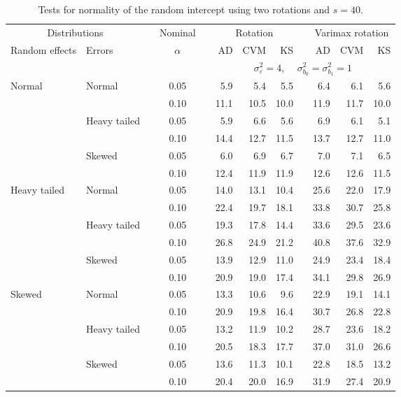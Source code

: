 \begin{table}[ht]
\caption{\label{tab:simb0s40-alt}Tests for normality of the random intercept using two rotations and $s = 40$.}
\begin{scriptsize}
\begin{center}
\begin{tabular}{ll p{.1cm} c p{.1cm} rrr p{.1cm} rrr}
  \hline
  \multicolumn{2}{c}{Distributions}& & Nominal & &  \multicolumn{3}{c}{Rotation} & & \multicolumn{3}{c}{Varimax rotation} \\ \cline{1-2} \cline{6-8} \cline{10-12}   
  Random effects & Errors & & $\alpha$ & & AD & CVM & KS & & AD & CVM & KS \\ 
   \hline
& && && \multicolumn{7}{c}{$\sigma_{\varepsilon}^2 = 4$, \ \ $\sigma_{b_0}^2 = \sigma_{b_1}^2 = 1$} \\ \cline{6-12}
Normal       & Normal       && 0.05 &&   5.9 & 5.4 & 5.5 &   & 6.4 & 6.1 & 5.6 \\ 
             &              && 0.10 &&   11.1 & 10.5 & 10.0 &   & 11.9 & 11.7 & 10.0 \\ 
             & Heavy tailed && 0.05 &&   5.9 & 6.6 & 5.6 &   & 6.9 & 6.1 & 5.1 \\ 
             &              && 0.10 &&   14.4 & 12.7 & 11.5 &   & 13.7 & 12.7 & 11.0 \\ 
             & Skewed       && 0.05 &&   6.0 & 6.9 & 6.7 &   & 7.0 & 7.1 & 6.5 \\ 
             &              && 0.10 &&   12.4 & 11.9 & 11.9 &   & 12.6 & 12.6 & 11.5 \\ 
Heavy tailed & Normal       && 0.05 &&   14.0 & 13.1 & 10.4 &   & 25.6 & 22.0 & 17.9 \\ 
             &              && 0.10 &&   22.4 & 19.7 & 18.1 &   & 33.8 & 30.7 & 25.8 \\ 
             & Heavy tailed && 0.05 &&   19.3 & 17.8 & 14.4 &   & 33.6 & 29.5 & 23.6 \\ 
             &              && 0.10 &&   26.8 & 24.9 & 21.2 &   & 40.8 & 37.6 & 32.9 \\ 
             & Skewed       && 0.05 &&   13.9 & 12.9 & 11.0 &   & 24.9 & 23.4 & 18.4 \\ 
             &              && 0.10 &&   20.9 & 19.0 & 17.4 &   & 34.1 & 29.8 & 26.9 \\ 
Skewed       & Normal       && 0.05 &&   13.3 & 10.6 & 9.6 &   & 22.9 & 19.1 & 14.1 \\ 
             &              && 0.10 &&   20.9 & 19.8 & 16.4 &   & 30.7 & 26.8 & 22.8 \\ 
             & Heavy tailed && 0.05 &&   13.2 & 11.9 & 10.2 &   & 28.7 & 23.6 & 18.2 \\ 
             &              && 0.10 &&   20.5 & 18.3 & 17.7 &   & 37.0 & 31.0 & 26.6 \\ 
             & Skewed       && 0.05 &&   13.6 & 11.3 & 10.1 &   & 22.8 & 18.5 & 13.2 \\ 
             &              && 0.10 &&   20.4 & 20.0 & 16.9 &   & 31.9 & 27.4 & 20.9 \\ 


\end{tabular}
\end{center}
\end{scriptsize}
\end{table}
